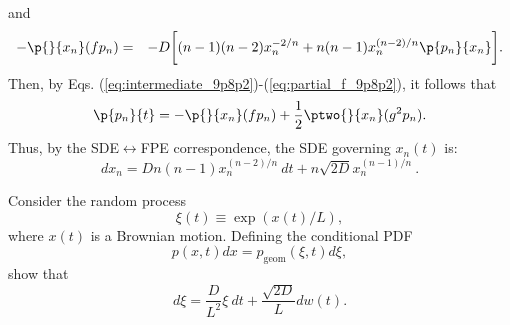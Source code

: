 and
\begin{eqnarray}
-\p{}{x_n}(f p_n) &=& -D \bigg[ (n-1)(n-2) x_n^{-2/n} + n(n-1) x_n^{(n-2)/n} \p{p_n}{x_n} \bigg] \label{eq:partial_f_9p8p2}.
\end{eqnarray}
Then, by Eqs. (\ref{eq:intermediate_9p8p2})-(\ref{eq:partial_f_9p8p2}), it follows that
\begin{equation}
\p{p_n}{t} = -\p{}{x_n}(f p_n)  + \frac{1}{2} \ptwo{}{x_n}(g^2 p_n).
\end{equation}
Thus, by the SDE$\leftrightarrow$FPE correspondence, the SDE governing $x_n(t)$ is:
\begin{equation}
\boxed{d x_n = Dn(n-1) x_n^{(n-2)/n} ~ dt  + n \sqrt{2D} x_n^{(n-1)/n}}~.
\end{equation}

Consider the random process
\begin{equation}
\xi(t) \equiv \exp(x(t)/L),
\end{equation}
where $x(t)$ is a Brownian motion. Defining the conditional PDF
\begin{equation}
p(x,t) dx = p_\text{geom}(\xi, t) d \xi,
\end{equation}
show that
\begin{equation}
d \xi = \frac{D}{L^2} \xi ~ dt + \frac{\sqrt{2D}}{L} dw(t).
\end{equation}

